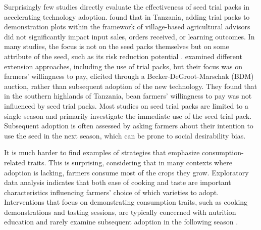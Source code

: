 \documentclass[english]{article}\usepackage[]{graphicx}\usepackage[]{xcolor}
\begin{document}
Surprisingly few studies directly evaluate the effectiveness of seed
trial packs in accelerating technology adoption. \citet{biedny2020demonstration}
found that in Tanzania, adding trial packs to demonstration plots
within the framework of village-based agricultural advisors did not
significantly impact input sales, orders received, or learning outcomes.
In many studies, the focus is not on the seed packs themselves but
on some attribute of the seed, such as its risk reduction potential
\citep[eg.][]{boucher2021bundling}. \citet{MORGAN2020101955} examined
different extension approaches, including the use of trial packs,
but their focus was on farmers' willingness to pay, elicited through
a Becker-DeGroot-Marschak (BDM) auction, rather than subsequent adoption
of the new technology. They found that in the southern highlands of
Tanzania, bean farmers' willingness to pay was not influenced by seed
trial packs. Most studies on seed trial packs are limited to a single
season and primarily investigate the immediate use of the seed trial
pack. Subsequent adoption is often assessed by asking farmers about
their intention to use the seed in the next season, which can be prone
to social desirability bias. 

It is much harder to find examples of strategies that emphasize consumption-related
traits. This is surprising, considering that in many contexts where
adoption is lacking, farmers consume most of the crops they grow.
Exploratory data analysis indicates that both ease of cooking and
taste are important characteristics influencing farmers' choice of
which varieties to adopt. Interventions that focus on demonstrating
consumption traits, such as cooking demonstrations and tasting sessions,
are typically concerned with nutrition education and rarely examine
subsequent adoption in the following season \citep[eg.][]{REICKS2014259}.
\end{document}
